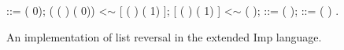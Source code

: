 \begin{figure}
\begin{coqdoccode}
\coqdocindent{7.00em}
 ::= ( 0);\coqdoceol
\coqdocindent{7.00em}
  ( ( ) ( 0)) \coqdoceol
\coqdocindent{10.00em}
 <$\sim$ [  ( ) ( 1) ];\coqdoceol
\coqdocindent{10.00em}
[  ( ) ( 1) ] <$\sim$ ( );\coqdoceol
\coqdocindent{10.00em}
 ::= ( );\coqdoceol
\coqdocindent{10.00em}
 ::= ( )\coqdoceol
\coqdocindent{7.00em}
.\coqdoceol
\end{coqdoccode}
\caption{An implementation of list reversal in the extended Imp language.}
\label{fig:list_reversal}
\end{figure}